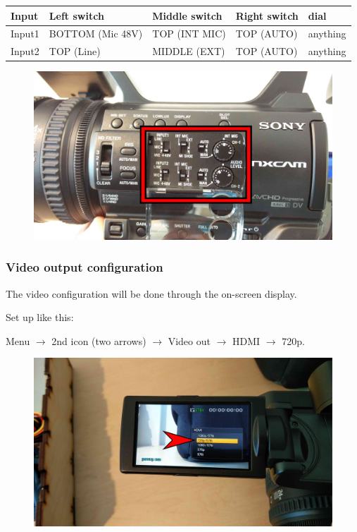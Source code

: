 \documentclass{article}
\begin{document}
\begin{tabular}{| l || l | l | l | l |}
Input & Left switch & Middle switch & Right switch & dial \\ \hline
Input1 & BOTTOM (Mic 48V) & TOP (INT MIC) & TOP (AUTO) & anything \\
Input2 & TOP (Line) & MIDDLE (EXT) & TOP (AUTO) & anything \\
\end{tabular}

\begin{figure}[H]
  \centering
\includegraphics[width = 120mm]{Sony04.jpg}
\end{figure}

\subsubsection{Video output configuration}
The video configuration will be done through the on-screen display.

Set up like this:

Menu $\rightarrow$ 2nd icon (two arrows) $\rightarrow$ Video out $\rightarrow$ HDMI $\rightarrow$ 720p.
\begin{figure}[H]
  \centering
\includegraphics[width = 120mm]{Sony05.jpg}
\end{figure}
\end{document}
